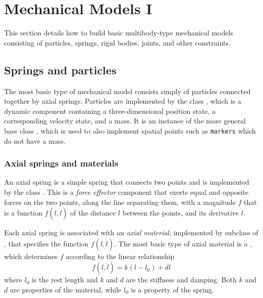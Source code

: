 \section{Mechanical Models I}
\label{MechModelsI:sec}

This section details how to build basic multibody-type mechanical
models consisting of particles, springs, rigid bodies, joints, and
other constraints.

\subsection{Springs and particles}
\label{ParticlesAndSprings:sec}

The most basic type of mechanical model consists simply of particles
connected together by axial springs.  Particles are implemented by the
class , which is a
dynamic component containing a three-dimensional position state, a
corresponding velocity state, and a mass. It is an instance of the
more general base class ,
which is used to also implement spatial points such as {\tt markers}
which do not have a mass.

\subsubsection{Axial springs and materials}

An axial spring is a simple spring that connects two points and is
implemented by the class
. This is a {\it
force effector} component that exerts equal and opposite forces on the
two points, along the line separating them, with a magnitude $f$ that
is a function $f(l, \dot l)$ of the distance $l$ between the points,
and its derivative $\dot l$.

Each axial spring is associated with an {\it axial material},
implemented by subclass of
, that specifies
the function $f(l, \dot l)$. The most basic type of axial material is
a , which
determines $f$ according to the linear relationship
%
\begin{equation}
f(l, \dot l) = k (l-l_0) + d \dot l
\end{equation}
%
where $l_0$ is the rest length and $k$ and $d$ are the stiffness and
damping. Both $k$ and $d$ are properties of the material, while $l_0$
is a property of the spring. 

